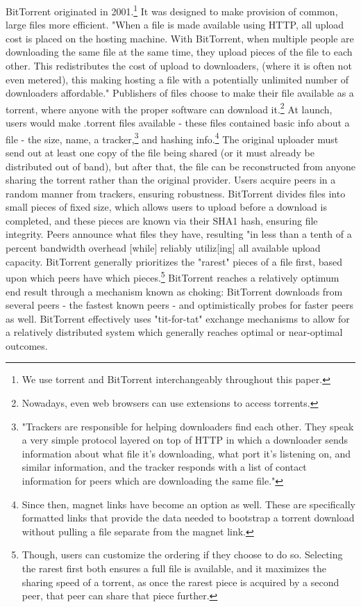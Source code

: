 \documentclass[12pt]{report}
\begin{document}
BitTorrent originated in 2001.\footnote{We use torrent and BitTorrent interchangeably throughout this paper.} It was designed to make provision of common, large files more efficient. "When a file is made available using HTTP, all upload cost is placed on the hosting machine. With BitTorrent, when multiple people are downloading the same file at the same time, they upload pieces of the file to each other. This redistributes the cost of upload to downloaders, (where it is often not even metered), this making hosting a file with a potentially unlimited number of downloaders affordable."\cite{torrent} Publishers of files choose to make their file available as a torrent, where anyone with the proper software can download it.\footnote{Nowadays, even web browsers can use extensions to access torrents.\cite{webtorrent}} At launch, users would make .torrent files available - these files contained basic info about a file - the size, name, a tracker,\footnote{"Trackers are responsible for helping downloaders find each other. They speak a very simple protocol layered on top of HTTP in which a downloader sends information about what file it’s downloading, what port it’s listening on, and similar information, and the tracker responds with a list of contact information for peers which are downloading the same file."\cite{torrent}} and hashing info.\footnote{Since then, magnet links have become an option as well. These are specifically formatted links that provide the data needed to bootstrap a torrent download without pulling a file separate from the magnet link.}\cite{torrent} The original uploader must send out at least one copy of the file being shared (or it must already be distributed out of band), but after that, the file can be reconstructed from anyone sharing the torrent rather than the original provider. Users acquire peers in a random manner from trackers, ensuring robustness. BitTorrent divides files into small pieces of fixed size, which allows users to upload before a download is completed, and these pieces are known via their SHA1 hash, ensuring file integrity. Peers announce what files they have, resulting "in less than a tenth of a percent bandwidth overhead [while] reliably utiliz[ing] all available upload capacity.\cite{torrent} BitTorrent generally prioritizes the "rarest" pieces of a file first, based upon which peers have which pieces.\footnote{Though, users can customize the ordering if they choose to do so. Selecting the rarest first both ensures a full file is available, and it maximizes the sharing speed of a torrent, as once the rarest piece is acquired by a second peer, that peer can share that piece further.} BitTorrent reaches a relatively optimum end result through a mechanism known as choking: BitTorrent downloads from several peers - the fastest known peers - and optimistically probes for faster peers as well.\cite{torrent} BitTorrent effectively uses "tit-for-tat" exchange mechanisms to allow for a relatively distributed system which generally reaches optimal or near-optimal outcomes.
\end{document}
